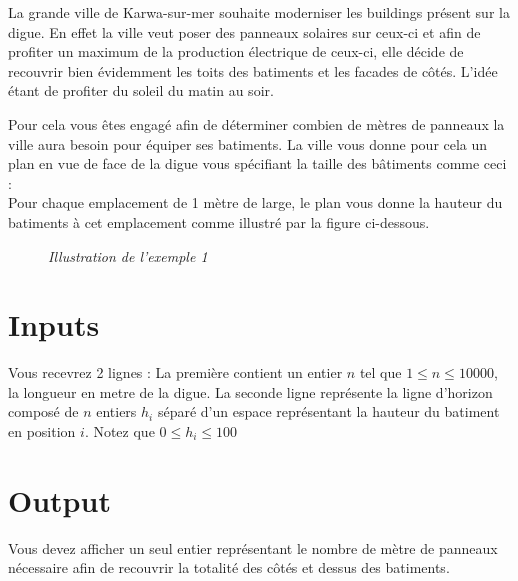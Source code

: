 \documentclass{article} %
\begin{document}
La grande ville de Karwa-sur-mer souhaite moderniser les buildings présent sur la digue. En effet la ville veut poser des panneaux solaires sur ceux-ci et afin de profiter un maximum de la production électrique de ceux-ci, elle décide de recouvrir bien évidemment les toits des batiments et les facades de côtés. L'idée étant de profiter du soleil du matin au soir.


Pour cela vous êtes engagé afin de déterminer combien de mètres de panneaux la ville aura besoin pour équiper ses batiments. La ville vous donne pour cela un plan en vue de face de la digue vous spécifiant la taille des bâtiments comme ceci : \\

Pour chaque emplacement de 1 mètre de large, le plan vous donne la hauteur du batiments à cet emplacement comme illustré par la figure ci-dessous.

\begin{figure}[h]
\centering
{}
\newline
\textit{Illustration de l'exemple 1}
\end{figure}


\section*{Inputs}
Vous recevrez 2 lignes :
La première contient un entier $n$ tel que $1 \leq n \leq 10 000$, la longueur en metre de la digue.
La seconde ligne représente la ligne d'horizon composé de $n$ entiers $h_{i}$ séparé d'un espace représentant la hauteur du batiment en position $i$. Notez que $0 \leq h_{i} \leq 100$

\section*{Output}
Vous devez afficher un seul entier représentant le nombre de mètre de panneaux nécessaire afin de recouvrir la totalité des côtés et dessus des batiments.
\end{document}

